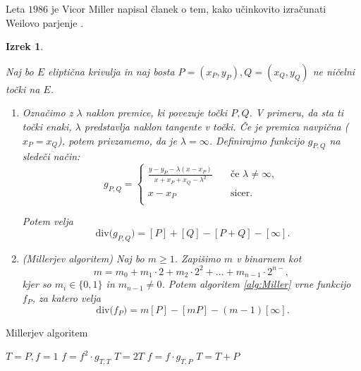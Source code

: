 \documentclass[12pt,a4paper,twoside]{article}
\theoremstyle{definition} %
\theoremstyle{plain} %
\newtheorem{izrek}[definicija]{Izrek}
\numberwithin{equation}{section}  %
\newcommand{\Div}[1]{\ \text{div(}{#1}\text{)}}
\begin{document}
Leta $1986$ je Vicor Miller napisal članek o tem, kako učinkovito izračunati Weilovo parjenje \cite{Miller} .

\begin{izrek}~

\label{izrek:Miller}

Naj bo $E$ eliptična krivulja in naj bosta $P=(x_P,y_P), Q = (x_Q,y_Q)$ ne ničelni točki na $E$.
\begin{enumerate}
\item Označimo z $\lambda$ naklon premice, ki povezuje točki $P,Q$. V primeru, da sta ti točki enaki, $\lambda$ predstavlja naklon tangente v točki. Če je premica navpična ($x_P = x_Q$), potem privzamemo, da je $\lambda = \infty$. Definirajmo funkcijo $g_{P,Q}$ na sledeči način:
\[ g_{P,Q} =
\begin{cases}
\frac{y-y_P-\lambda(x-x_P)}{x+x_P+x_Q-\lambda^2} & \quad \text{če } \lambda \neq \infty ,\\
x-x_P & \quad \text{sicer} .\\
\end{cases}
\]

Potem velja 
$$\Div{g_{P,Q}} = [P] + [Q] - [P+Q] - [\infty].$$


\item (Millerjev algoritem) Naj bo $m \geq 1$. Zapišimo $m$ v binarnem kot
$$m = m_0+m_1\cdot 2 + m_2\cdot 2^2 + \ldots + m_{n-1}\cdot 2^{n-},$$
kjer so $m_i \in \{ 0,1 \}$ in $m_{n-1} \neq 0$. Potem algoritem \ref{alg:Miller} vrne
funkcijo $f_P$, za katero velja
$$\Div{f_P} = m[P]-[mP]-(m-1)[\infty].$$ 


\end{enumerate}


\end{izrek}

\begin{algorithm}[H]
\caption[Miller]{Millerjev algoritem}
\label{alg:Miller}

\begin{algorithmic}
\State $T = P,f = 1$
	\State $f = f^2 \cdot g_{T,T}$
	\State $T = 2T$
		\State $f = f \cdot g_{T,P}$
		\State $T=T+P$
	\EndIf
	
\EndFor

\end{algorithmic}
\end{algorithm}
\end{document}
